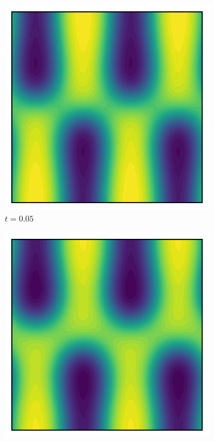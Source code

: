 \documentclass{article} %
\begin{document}
\begin{figure}[!h]
\begin{subfigure}[b]{0.2\textwidth}
        \includegraphics[width=\textwidth]{phi_0.05.pdf}
        \caption*{$t = 0.05$}
        \label{fig:image2}
    \end{subfigure}
    \hfill
    \begin{subfigure}[b]{0.2\textwidth}
        \includegraphics[width=\textwidth]{phi_0.1.pdf}

\end{subfigure}
\end{figure}
\end{document}
